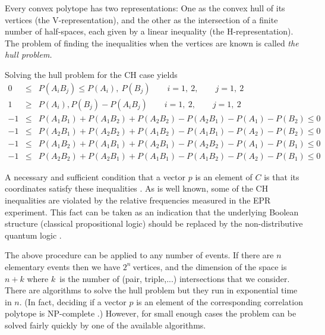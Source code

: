 Every convex polytope has  two
representations:
One as the convex hull of its vertices (the V-representation), and the other
as the intersection
of a finite number of half-spaces, each given by a linear inequality (the
H-representation).
The problem of finding the inequalities when the vertices are known is
called {\em the hull problem.}

Solving the hull problem for the CH case yields
\begin{eqnarray}
0&\leq & P(A_{i}B_{j})\leq P(A_{i}),\ P(B_{j}) \qquad  i=1,\ 2,\qquad  j=1,\ 2
\nonumber \\
1&\geq & P(A_{i}), P(B_{j})-P(A_{i}B_{j})\qquad i=1,\ 2,\qquad j=1,\ 2
\nonumber \\
-1&\leq& P(A_{1}B_{1})+P(A_{1}B_{2})+P(A_{2}B_{2})-P(A_{2}B_{1})-P(A_{1})-P(B_{2}) \leq 0
\nonumber \\
-1&\leq&  P(A_{2}B_{1})+P(A_{2}B_{2})+P(A_{1}B_{2})-P(A_{1}B_{1})-P(A_{2})-P(B_{2})\leq 0
\nonumber \\
-1&\leq&  P(A_{1}B_{2})+P(A_{1}B_{1})+P(A_{2}B_{1})-P(A_{2}B_{2})-P(A_{1})-P(B_{1})\leq 0
\nonumber \\
-1&\leq&  P(A_{2}B_{2})+P(A_{2}B_{1})+P(A_{1}B_{1})-P(A_{1}B_{2})-P(A_{2})-P(B_{1})\leq 0
\nonumber
\end{eqnarray}

A necessary and sufficient condition that a vector $p$ is an element of $C$
 is that its coordinates satisfy
these inequalities \cite{pitowsky}.
As is well known, some of the CH inequalities are
violated by the relative
frequencies measured in the EPR experiment. This fact can be taken as an
indication that
the underlying Boolean structure (classical propositional logic) should be
replaced by the
non-distributive quantum logic \cite{pitowsky,svozil-ql}.

The above procedure can be applied to any number of events. If there are $n$
elementary events then we have $2^{n}\ $vertices, and the dimension of the
space is $n+k$ where
$k$\ is the number of (pair, triple,...) intersections that we consider.
There are algorithms to
solve the hull problem but they run in exponential time in $n$.
(In fact,
deciding if a vector $p$
is an element of the corresponding correlation polytope is NP-complete \cite{Pit-91}.)
However, for small enough cases the problem can be solved fairly quickly by
one of the
available algorithms.

